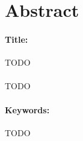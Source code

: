 \documentclass[12pt,a4paper,twoside]{report}
\begin{document}
\section*{Abstract}
\paragraph{Title:} TODO\\\\
TODO
\paragraph{Keywords:} TODO

\newpage
\tableofcontents
\newpage









\end{document}
